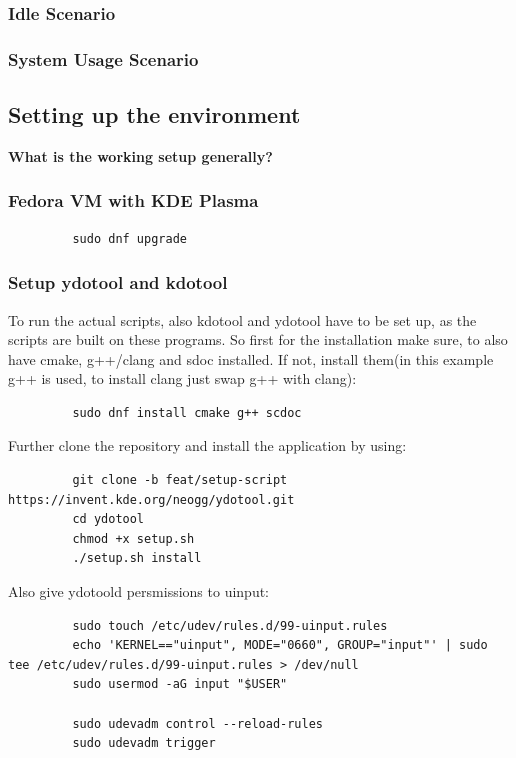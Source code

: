 \documentclass{article}
\begin{document}
        \subsubsection{Idle Scenario}
        \subsubsection{System Usage Scenario}

        \subsection{Setting up the environment}
        \textbf{What is the working setup generally?}
        \subsubsection{Fedora VM with KDE Plasma}

        \begin{lstlisting}
         sudo dnf upgrade
        \end{lstlisting}

        \subsubsection{Setup ydotool and kdotool}
        To run the actual scripts, also kdotool and ydotool have to be set up, as the scripts are built on these programs. So first for the installation make sure, to also have cmake, g++/clang and sdoc installed. If not, install them(in this example g++ is used, to install clang just swap g++ with clang):
        \begin{lstlisting}
         sudo dnf install cmake g++ scdoc
        \end{lstlisting}

        Further clone the repository and install the application by using:
        \begin{lstlisting}
         git clone -b feat/setup-script https://invent.kde.org/neogg/ydotool.git
         cd ydotool
         chmod +x setup.sh
         ./setup.sh install
        \end{lstlisting}

        Also give ydotoold persmissions to uinput:
        \begin{lstlisting}
         sudo touch /etc/udev/rules.d/99-uinput.rules
         echo 'KERNEL=="uinput", MODE="0660", GROUP="input"' | sudo tee /etc/udev/rules.d/99-uinput.rules > /dev/null
         sudo usermod -aG input "$USER"

         sudo udevadm control --reload-rules
         sudo udevadm trigger
        \end{lstlisting}
\end{document}
